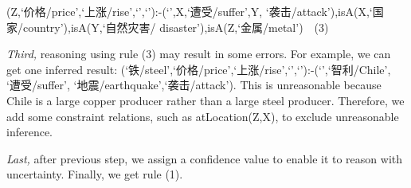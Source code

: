 (Z,`价格/price',`上涨/rise',`',`'):-(`',X,`遭受/suffer',Y,
`袭击/attack'),isA(X,`国家/country'),isA(Y,`自然灾害/
disaster'),isA(Z,`金属/metal')\ \ (3)


\textit{Third,} reasoning using rule (3) may result in some errors. For example, we can get one inferred result: (`铁/steel',`价格/price',`上涨/rise',`',`'):-(`',`智利/Chile', `遭受/suffer', `地震/earthquake',`袭击/attack'). This is unreasonable because Chile is a large copper producer rather than a large steel producer. Therefore, we add some constraint relations, such as atLocation(Z,X), to exclude unreasonable inference.

	
\textit{Last,} after previous step, we assign a confidence value to enable it to reason with uncertainty. Finally, we get rule (1).

